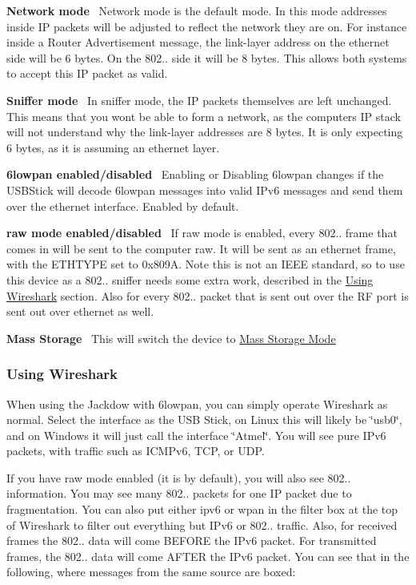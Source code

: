 {\bfseries Network mode}~\newline
 Network mode is the default mode. In this mode addresses inside IP packets will be adjusted to reflect the network they are on. For instance inside a Router Advertisement message, the link-\/layer address on the ethernet side will be 6 bytes. On the 802.. side it will be 8 bytes. This allows both systems to accept this IP packet as valid.

{\bfseries Sniffer mode}~\newline
 In sniffer mode, the IP packets themselves are left unchanged. This means that you won\textquotesingle{}t be able to form a network, as the computer\textquotesingle{}s IP stack will not understand why the link-\/layer addresses are 8 bytes. It is only expecting 6 bytes, as it is assuming an ethernet layer.

{\bfseries 6lowpan enabled/disabled}~\newline
 Enabling or Disabling 6lowpan changes if the U\+S\+B\+Stick will decode 6lowpan messages into valid I\+Pv6 messages and send them over the ethernet interface. Enabled by default.

{\bfseries raw mode enabled/disabled}~\newline
 If raw mode is enabled, every 802.. frame that comes in will be sent to the computer raw. It will be sent as an ethernet frame, with the E\+T\+H\+T\+Y\+PE set to 0x809A. Note this is not an I\+E\+EE standard, so to use this device as a 802.. sniffer needs some extra work, described in the \hyperlink{a00067_Wireshark}{Using Wireshark} section. Also for every 802.. packet that is sent out over the RF port is sent out over ethernet as well.

{\bfseries Mass Storage}~\newline
 This will switch the device to \hyperlink{a00067_MassStorageMode}{Mass Storage Mode}\hypertarget{a00067_Wireshark}{}\subsubsection{Using Wireshark}\label{a00067_Wireshark}
When using the Jackdow with 6lowpan, you can simply operate Wireshark as normal. Select the interface as the U\+SB Stick, on Linux this will likely be \char`\"{}usb0\char`\"{}, and on Windows it will just call the interface \char`\"{}\+Atmel\char`\"{}. You will see pure I\+Pv6 packets, with traffic such as I\+C\+M\+Pv6, T\+CP, or U\+DP.

If you have raw mode enabled (it is by default), you will also see 802.. information. You may see many 802.. packets for one IP packet due to fragmentation. You can also put either \textquotesingle{}ipv6\textquotesingle{} or \textquotesingle{}wpan\textquotesingle{} in the filter box at the top of Wireshark to filter out everything but I\+Pv6 or 802.. traffic. Also, for received frames the 802.. data will come B\+E\+F\+O\+RE the I\+Pv6 packet. For transmitted frames, the 802.. data will come A\+F\+T\+ER the I\+Pv6 packet. You can see that in the following, where messages from the same source are boxed\+:



